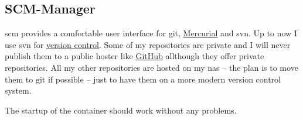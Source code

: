 

\subsection{SCM-Manager}

\gls{scm} provides a comfortable user interface for \gls{git},
\href{https://www.mercurial-scm.org}{Mercurial} and \gls{svn}. Up to now I use
\gls{svn} for \href{https://en.wikipedia.org/wiki/Version_control}{version control}.
Some of my repositories are private and I will never publish them to a public
hoster like \href{https://github.com}{GitHub} allthough they offer private
repositories. All my other repositories are hosted on my \gls{nas} -- the plan
is to move them to \gls{git} if possible -- just to have them on a more modern
version control system.
\bigbreak


The startup of the container should work without any problems.


